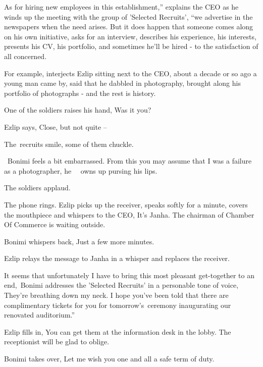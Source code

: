 \documentclass[letterpaper]{article}
\begin{document}
{\textquotedbl}As for hiring new employees in this establishment,{}'' explains the CEO as he winds up the meeting with
the group of 'Selected Recruits', ``we advertise in the newspapers when the need arises. But it does happen that
someone comes along on his own initiative, asks for an interview, describes his experience, his interests, presents his
CV, his portfolio, and sometimes he'll be hired - to the satisfaction of all concerned.{\textquotedbl} 

{\textquotedbl}For example,{\textquotedbl} interjects Ezlip sitting next to the CEO, {\textquotedbl}about a decade or so
ago a young man came by, said that he dabbled in photography, brought along his portfolio of photographs - and the rest
is history.{\textquotedbl} 

One of the soldiers raises his hand, {\textquotedbl}Was it you?{\textquotedbl} \ 

Ezlip says, {\textquotedbl}Close, but not quite --{\textquotedbl} 

The\ recruits smile, some of them chuckle\textcolor[rgb]{0.0,0.4392157,0.7529412}{.}

~Bonimi feels a bit embarrassed. {\textquotedbl}From this you may assume that I was a failure as a
photographer,{\textquotedbl} he \ \ owns up pursing his lips. 

The soldiers applaud.~ 

The phone rings. Ezlip picks up the receiver, speaks softly for a minute, covers the mouthpiece and whispers to the CEO,
{\textquotedbl}It's Janha. The chairman of Chamber Of Commerce is waiting outside.{\textquotedbl} 

Bonimi whispers back, {\textquotedbl}Just a few more minutes.{\textquotedbl} 

Ezlip relays the message to Janha in a whisper and replaces the receiver.

{\textquotedbl}It seems that unfortunately I have to bring this most pleasant get-together to an
end,{\textquotedbl}\ Bonimi addresses the 'Selected Recruits' in a personable tone of voice, {\textquotedbl}They're
breathing down my neck. I hope you've been told that there are complimentary tickets for you for
tomorrow's\textcolor[rgb]{0.0,0.4392157,0.7529412}{\ }ceremony inaugurating our renovated auditorium.'' 

Ezlip fills in, {\textquotedbl}You can get them at the information desk in the lobby. The receptionist will be glad to
oblige.{\textquotedbl} 

Bonimi takes over, {\textquotedbl}Let me wish you one and all a safe term of duty.{\textquotedbl}\ 
\end{document}
